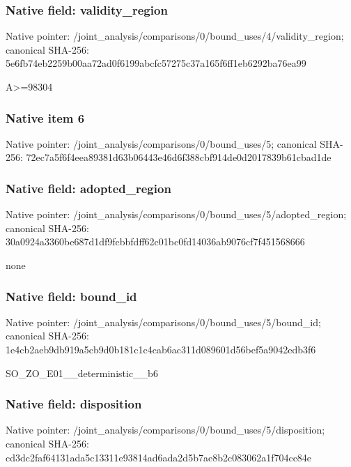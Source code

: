 \documentclass[10pt,a4paper]{article}
\begin{document}
\subsubsection{Native field: validity\_\allowbreak{}region}
Native pointer: /joint\_\allowbreak{}analysis/comparisons/0/bound\_\allowbreak{}uses/4/validity\_\allowbreak{}region; canonical SHA-256: 5e6fb74eb2259b00aa72ad0f6199abcfc57275c37a165f6ff1eb6292ba76ea99

\begingroup\raggedright\sloppy A>=\allowbreak{}98304\par\endgroup

\subsubsection{Native item 6}
Native pointer: /joint\_\allowbreak{}analysis/comparisons/0/bound\_\allowbreak{}uses/5; canonical SHA-256: 72ec7a5f6f4eea89381d63b06443e46d6f388cbf914de0d2017839b61cbad1de

\subsubsection{Native field: adopted\_\allowbreak{}region}
Native pointer: /joint\_\allowbreak{}analysis/comparisons/0/bound\_\allowbreak{}uses/5/adopted\_\allowbreak{}region; canonical SHA-256: 30a0924a3360be687d1df9fcbbfdff62c01bc0fd14036ab9076cf7f451568666

\begingroup\raggedright\sloppy none\par\endgroup

\subsubsection{Native field: bound\_\allowbreak{}id}
Native pointer: /joint\_\allowbreak{}analysis/comparisons/0/bound\_\allowbreak{}uses/5/bound\_\allowbreak{}id; canonical SHA-256: 1e4cb2aeb9db919a5cb9d0b181c1c4cab6ac311d089601d56bef5a9042edb3f6

\begingroup\raggedright\sloppy SO\_\allowbreak{}ZO\_\allowbreak{}E01\_\allowbreak{}\_\allowbreak{}deterministic\_\allowbreak{}\_\allowbreak{}b6\par\endgroup

\subsubsection{Native field: disposition}
Native pointer: /joint\_\allowbreak{}analysis/comparisons/0/bound\_\allowbreak{}uses/5/disposition; canonical SHA-256: cd3dc2faf64131ada5c13311e93814ad6ada2d5b7ae8b2c083062a1f704cc84e
\end{document}
